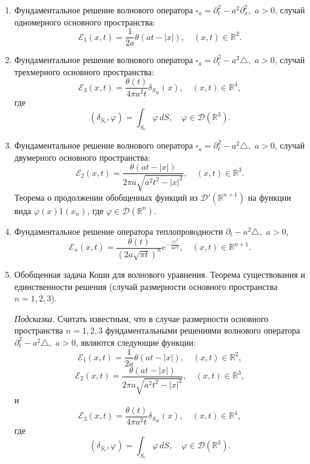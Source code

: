 \documentclass[unicode,12pt,draft]{article}
\begin{document}
\begin{enumerate}
\item
Фундаментальное решение волнового оператора $
    \square_a = \partial_t^2 - a^2 \partial_x^2,
$ $a > 0$, случай одномерного основного пространства:
$$
    {\mathcal E}_1 (x, t)
    =
    \frac{1}{2 a}
    \theta (a t - |x|),
    \quad
    (x, t)
    \in
    {\mathbb R}^2.
$$

\item
Фундаментальное решение волнового оператора $
    \square_a = \partial_t^2 - a^2 \triangle,
$ $a > 0$, случай трехмерного основного пространства:
$$
    {\mathcal E}_3 (x, t)
    =
    \frac{
        \theta (t)
    }{
        4
        \pi
        a^2
        t
    }
    \delta_{
        S_{at}
    }
     (x),
    \quad
    (x, t)
    \in
    {\mathbb R}^4,
$$
где
$$
    (\delta_{S_r}, \varphi)
    =
    \int_{
        S_r
    }
    \varphi
    \,
    dS,
    \quad
    \varphi \in {\mathcal D} ({\mathbb R}^3).
$$

\item
Фундаментальное решение волнового оператора $
    \square_a = \partial_t^2 - a^2 \triangle,
$ $a > 0$, случай двумерного основного пространства:
$$
    {\mathcal E}_2 (x, t)
    =
    \frac{
        \theta (at - |x|)
    }{
        2
        \pi
        a
        \sqrt{
            a^2 t^2 - |x|^2
        }
    },
    \quad
    (x, t)
    \in
    {\mathbb R}^3.
$$
Теорема о продолжении обобщенных функций из ${\mathcal D}'
({\mathbb R}^{n+1})$ на функции вида $\varphi (x) 1 (x_n)$, где
$\varphi \in {\mathcal D} ({\mathbb R}^n)$.

\item
Фундаментальное решение оператора теплопроводности $
    \partial_t - a^2 \triangle,
$ $a > 0$,
$$
    {\mathcal E}_n (x, t)
    =
    \frac{
        \theta (t)
    }{
        (
            2
            a
            \sqrt{
                \pi t
            }
        )^n
    }
    e^{
        - \frac{
            |x|^2
        }{
            4 a^2 t
        }
    },
    \quad
    (x, t) \in {\mathbb R}^{n+1}.
$$

\item
Обобщенная задача Коши для волнового уравнения. Теорема
существования и единственности решения (случай размерности
основного пространства $n = 1,2,3$).

{\it Подсказка.} Считать известным, что в случае размерности
основного пространства $n = 1,2,3$ фундаментальными решениями
волнового оператора $
    \partial_t^2 - a^2 \triangle,
$ $a > 0$, являются следующие функции:
$$
    {\mathcal E}_1 (x, t)
    =
    \frac{1}{2 a}
    \theta (a t - |x|),
    \quad
    (x, t)
    \in
    {\mathbb R}^2,
$$
$$
    {\mathcal E}_2 (x, t)
    =
    \frac{
        \theta (at - |x|)
    }{
        2
        \pi
        a
        \sqrt{
            a^2 t^2 - |x|^2
        }
    },
    \quad
    (x, t)
    \in
    {\mathbb R}^3,
$$
и
$$
    {\mathcal E}_3 (x, t)
    =
    \frac{
        \theta (t)
    }{
        4
        \pi
        a^2
        t
    }
    \delta_{
        S_{at}
    }
     (x),
    \quad
    (x, t)
    \in
    {\mathbb R}^4,
$$
где
$$
    (\delta_{S_r}, \varphi)
    =
    \int_{
        S_r
    }
    \varphi
    \,
    dS,
    \quad
    \varphi \in {\mathcal D} ({\mathbb R}^3).
$$


\end{enumerate}
\end{document}
